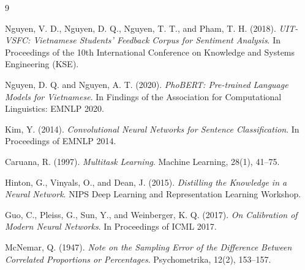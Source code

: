 \documentclass[12pt,a4paper]{report}
\begin{document}
\clearpage
{}
\begin{thebibliography}{9}

Nguyen, V. D., Nguyen, D. Q., Nguyen, T. T., and Pham, T. H. (2018).
\textit{UIT-VSFC: Vietnamese Students' Feedback Corpus for Sentiment Analysis}.
In Proceedings of the 10th International Conference on Knowledge and Systems Engineering (KSE).

Nguyen, D. Q. and Nguyen, A. T. (2020).
\textit{PhoBERT: Pre-trained Language Models for Vietnamese}.
In Findings of the Association for Computational Linguistics: EMNLP 2020.

Kim, Y. (2014).
\textit{Convolutional Neural Networks for Sentence Classification}.
In Proceedings of EMNLP 2014.

Caruana, R. (1997).
\textit{Multitask Learning}.
Machine Learning, 28(1), 41--75.

Hinton, G., Vinyals, O., and Dean, J. (2015).
\textit{Distilling the Knowledge in a Neural Network}.
NIPS Deep Learning and Representation Learning Workshop.

Guo, C., Pleiss, G., Sun, Y., and Weinberger, K. Q. (2017).
\textit{On Calibration of Modern Neural Networks}.
In Proceedings of ICML 2017.

McNemar, Q. (1947).
\textit{Note on the Sampling Error of the Difference Between Correlated Proportions or Percentages}.
Psychometrika, 12(2), 153--157.

\end{thebibliography}

\end{document}
